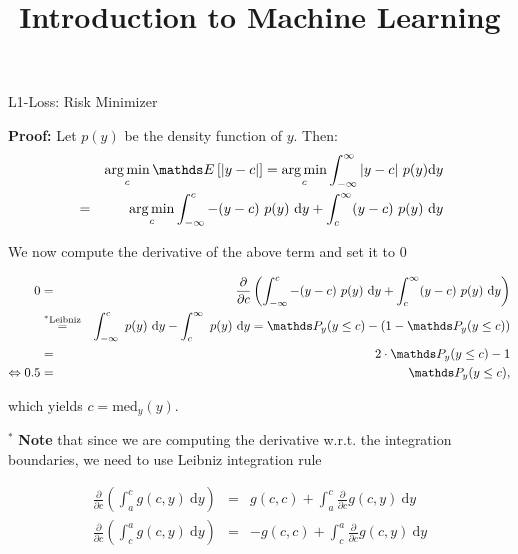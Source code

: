 \documentclass[11pt,compress,t,notes=noshow, xcolor=table]{beamer}
\title{Introduction to Machine Learning}
\begin{document}
    

\begin{vbframe}{L1-Loss: Risk Minimizer}

\begin{footnotesize}
\textbf{Proof:} Let $p(y)$ be the density function of $y$. Then: 
  \begin{eqnarray*}
  && \argmin_c \E\left[|y - c|\right] = \argmin_c \int_{-\infty}^\infty |y - c| ~ p(y) \text{d}y \\
  &=& \argmin_c \int_{-\infty}^c -(y - c)~p(y)~\text{d}y + \int_c^\infty (y - c)~p(y)~\text{d}y 
  \end{eqnarray*}

We now compute the derivative of the above term and set it to $0$

\begin{eqnarray*}
0 &=& \frac{\partial}{\partial c} \left(\int_{-\infty}^c -(y - c)~p(y)~\text{d}y + \int_c^\infty (y - c)~p(y)~\text{d}y\right) \\ &\overset{^\ast\text{Leibniz}}{=}& \int_{-\infty}^c  ~p(y)~\text{d}y - \int_c^\infty ~p(y)~\text{d}y =   \P_y (y \le c) - \left(1 - \P_y (y \le c)\right) \\
&=& 2 \cdot \P_y (y \le c) - 1 \\
\Leftrightarrow 0.5 &=& \P_y (y \le c),
\end{eqnarray*}

which yields $c = \text{med}_y(y)$. 

\framebreak 

$^\ast$ \textbf{Note} that since we are computing the derivative w.r.t. the integration boundaries, we need to use Leibniz integration rule 

\begin{eqnarray*}
  \frac{\partial}{\partial c} \left(\int_a^c g(c, y) ~\text{d}y\right) &=& g(c, c) + \int_a^c \frac{\partial}{\partial c} g(c, y) ~\text{d}y \\
  \frac{\partial}{\partial c} \left(\int_c^a g(c, y) ~\text{d}y\right) &=& - g(c, c) + \int_c^a \frac{\partial}{\partial c} g(c, y) ~\text{d}y    
\end{eqnarray*}


\end{footnotesize}
\end{vbframe}
\end{document}
